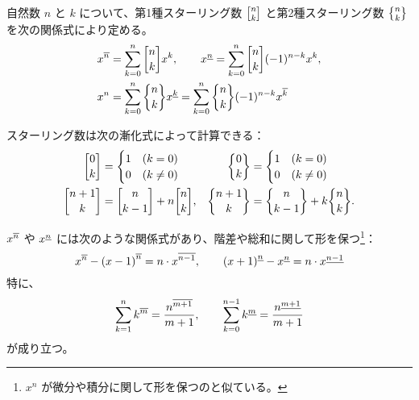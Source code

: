 {自然数 $n$ と $k$ について、第1種スターリング数 $\stirlingI{n}{k}$ と第2種スターリング数 $\stirlingII{n}{k}$ を次の関係式により定める。
\begin{align*}
  \risingFactorial{x}{n}&=\sum_{k=0}^n \stirlingI{n}{k} x^k, \qquad
  \fallingFactorial{x}{n}=\sum_{k=0}^n \stirlingI{n}{k} (-1)^{n-k} x^k, \\
  x^n&=\sum_{k=0}^n \stirlingII{n}{k} \fallingFactorial{x}{k}
       =\sum_{k=0}^n \stirlingII{n}{k} (-1)^{n-k} \risingFactorial{x}{k}
\end{align*}

スターリング数は次の漸化式によって計算できる：
\begin{align*}
  \stirlingI{0}{k}&=\begin{cases}
    1 & (k=0) \\
    0 & (k\ne 0)
  \end{cases} &
  \stirlingII{0}{k}&=\begin{cases}
    1 & (k=0) \\
    0 & (k\ne 0)
  \end{cases} \\
  \stirlingI{n+1}{k}&=\stirlingI{n}{k-1}+n\stirlingI{n}{k}, &
  \stirlingII{n+1}{k}&=\stirlingII{n}{k-1}+k\stirlingII{n}{k}.
\end{align*}

${x}^{\overline{n}}$ や ${x}^{\underline{n}}$ には次のような関係式があり、階差や総和に関して形を保つ\footnote{$x^n$ が微分や積分に関して形を保つのと似ている。}：
\begin{equation*}
  {x}^{\overline{n}}-{(x-1)}^{\overline{n}}=n\cdot{x}^{\overline{n-1}}, \qquad
  {(x+1)}^{\underline{n}}-{x}^{\underline{n}}=n\cdot{x}^{\underline{n-1}}
\end{equation*}
特に、
\begin{equation*}
  \sum_{k=1}^{n} {k}^{\overline{m}}
  =\frac{{n}^{\overline{m+1}}}{m+1}, \qquad
  \sum_{k=0}^{n-1} {k}^{\underline{m}}
  =\frac{{n}^{\underline{m+1}}}{m+1}
\end{equation*}
が成り立つ。

}
